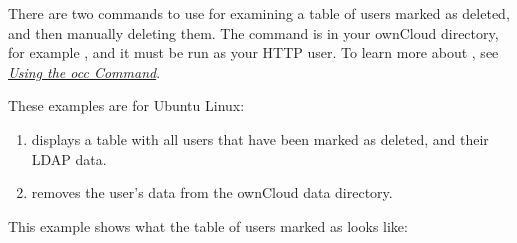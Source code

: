 \documentclass[letterpaper,10pt,english]{sphinxmanual}
\begin{document}
There are two  commands to use for examining a table of users marked as
deleted, and then manually deleting them.  The  command is in your
ownCloud directory, for example , and it must be run as
your HTTP user. To learn more about , see
{\hyperref[configuration_server/occ_command::doc]{\emph{Using the occ Command}}}.

These examples are for Ubuntu Linux:
\begin{enumerate}
\item {} 
 displays a table with all
users that have been marked as deleted, and their LDAP data.

\item {} 
 removes the user's data from the
ownCloud data directory.

\end{enumerate}

This example shows what the table of users marked as  looks like:
\end{document}
